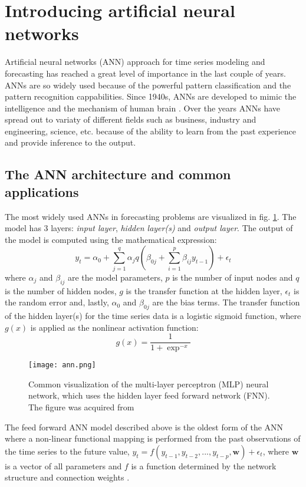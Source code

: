 \section{Introducing artificial neural networks}
Artificial neural networks (ANN) approach for time series modeling and forecasting has reached a great level of importance in the last couple of years.
ANNs are so widely used because of the powerful pattern classification and the pattern recognition cappabilities. 
Since 1940s, ANNs are developed to mimic the intelligence and the mechanism of human brain \cite{ann_history}.
Over the years ANNs have spread out to variaty of different fields such as business, industry and engineering, science, etc. because of the ability to learn from the past experience and provide inference to the output.

\subsection{The ANN architecture and common applications}
The most widely used ANNs in forecasting problems are visualized in fig. \ref{fig:ann}. 
The model has 3 layers: \emph{input layer}, \emph{hidden layer(s)} and \emph{output layer}.
The output of the model is computed using the mathematical expression: \cite{zhang_ann_ts}
\begin{equation}
    y_{t} = \alpha_{0} + \sum_{j=1}^{q}{\alpha_{j}q(\beta_{0j} + \sum_{i=1}^{p}{\beta_{ij}y_{t-1}}) + \epsilon_{t}}
\end{equation}
where $\alpha_{j}$ and $\beta_{ij}$ are the model parameters, $p$ is the number of input nodes and $q$ is the number of hidden nodes, $g$ is the transfer function at the hidden layer, $\epsilon_{t}$ is the random error and, lastly, $\alpha_{0}$ and $\beta_{0j}$ are the bias terms.
The transfer function of the hidden layer(s) for the time series data is a logistic sigmoid function, where $g(x)$ is applied as the nonlinear activation function:
\begin{equation}
    g(x) = \frac{1}{1 + \exp^{-x}}
\end{equation}
\begin{figure}[h]
    \centering
    \texttt{[image: ann.png]}
    \caption{Common visualization of the multi-layer perceptron (MLP) neural network, which uses the hidden layer feed forward network (FNN). The figure was acquired from \cite{ann_architecture}}
    \label{fig:ann}
\end{figure}
The feed forward ANN model described above is the oldest form of the ANN where a non-linear functional mapping is performed from the past observations of the time series to the future value, $y_{t} = f(y_{t-1}, y_{t-2}, ..., y_{t-p}, \textbf{w}) + \epsilon_{t}$, where $\textbf{w}$ is a vector of all parameters and $f$ is a function determined by the network structure and connection weights \cite{Adhikari_timeseries}.

